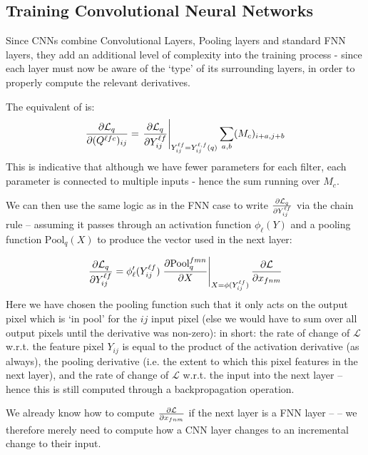 \documentclass[10pt, twocolumn]{article}
\begin{document}
		
		\subsection{Training Convolutional Neural Networks}

			Since CNNs combine Convolutional Layers, Pooling layers and standard FNN layers, they add an additional level of complexity into the training process - since each layer must now be aware of the `type' of its surrounding layers, in order to properly compute the relevant derivatives. 

			The equivalent of  is:
			\begin{equation}
				\frac{\partial \mathcal{L}_q}{\partial (Q^{\ell fc})_{ij}} = \left. \frac{\partial \mathcal{L}_q}{\partial Y^{\ell f}_{ij}} \right|_{Y^{\ell f}_{ij} = Y^{\ell,f}_{ij}(q)} \sum_{a,b} (M_c)_{i +a, j + b}\label{E:BaseDerivative_CNN}
			\end{equation}
			This is indicative that although we have fewer parameters for each filter, each parameter is connected to multiple inputs - hence the sum running over $M_c$. 

			We can then use the same logic as in the FNN case to write $\frac{\partial \mathcal{L}_q}{\partial Y^{\ell f}_{ij}}$ via the chain rule -- assuming it passes through an activation function $\phi_\ell(Y)$ and a pooling function $\text{Pool}_q(X)$ to produce the vector used in the next layer:
			
			\begin{equation}
				\frac{\partial \mathcal{L}_q}{\partial Y^{\ell f}_{ij}} = \phi_\ell^\prime(Y^{\ell f}_{ij}) \left.\frac{\partial \text{Pool}_q^{fmn}}{\partial X}\right|_{X = \phi(Y^{\ell f}_{ij})} \frac{\partial \mathcal{L}}{\partial x_{fnm}}
			\end{equation}
			Here we have chosen the pooling function such that it only acts on the output pixel which is `in pool' for the $ij$ input pixel (else we would have to sum over all output pixels until the derivative was non-zero): in short: the rate of change of $\mathcal{L}$ w.r.t. the feature pixel $Y_{ij}$ is equal to the product of the activation derivative (as always), the pooling derivative (i.e. the extent to which this pixel features in the next layer), and the rate of change of $\mathcal{L}$ w.r.t. the input into the next layer -- hence this is still computed through a backpropagation operation.

			We already know how to compute $\frac{\partial \mathcal{L}}{\partial x_{fnm}}$ if the next layer is a FNN layer --  -- we therefore merely need to compute how a CNN layer changes to an incremental change to their input. 
\end{document}

